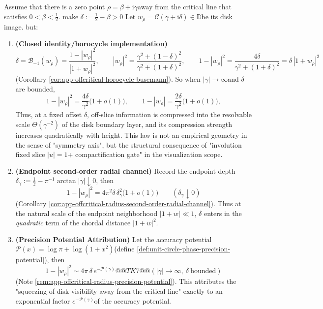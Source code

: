 \begin{theorem}\label{thm:xi-offcritical-quadratic-radial-compression}
Assume that there is a zero point \(\rho=\beta+\mathrm{i}\gamma\) ​​away from the critical line that satisfies \(0<\beta<\tfrac12\).
make
\(
\delta:=\tfrac12-\beta>0
\)
Let \(w_\rho=\mathcal{C}(\gamma+\mathrm{i}\delta)\in\mathbb{D}\) ​​be its disk image.
but:
\begin{enumerate}
  \item ​​\textbf{(Closed identity/horocycle implementation)}
  \[
  \delta=\mathcal{B}_{-1}(w_\rho)=\frac{1-|w_\rho|^2}{|1+w_\rho|^2},
  \qquad
  |w_\rho|^2=\frac{\gamma^2+(1-\delta)^2}{\gamma^2+(1+\delta)^2},
  \qquad
  1-|w_\rho|^2=\frac{4\delta}{\gamma^2+(1+\delta)^2}=\delta\,|1+w_\rho|^2
  \]
  (Corollary \ref{cor:app-offcritical-horocycle-busemann}).
  So when \(|\gamma|\to\infty\) ​​and \(\delta\) are bounded,
  \[
  1-|w_\rho|^{2}=\frac{4\delta}{\gamma^{2}}\bigl(1+o(1)\bigr),
  \qquad
  1-|w_\rho|=\frac{2\delta}{\gamma^{2}}\bigl(1+o(1)\bigr),
  \]
  Thus, at a fixed offset \(\delta\), off-slice information is compressed into the resolvable scale \(\Theta(\gamma^{-2})\) of the disk boundary layer, and its compression strength increases quadratically with height.
  This law is not an empirical geometry in the sense of "symmetry axis", but the structural consequence of "involution fixed slice \(|u|=1\) ​​+ compactification gate" in the visualization scope.
  \item ​​\textbf{(Endpoint second-order radial channel)}
  Record the endpoint depth \(\delta_\gamma:=\tfrac12-\pi^{-1}\arctan|\gamma|\downarrow 0\), then
  \[
  1-|w_\rho|^2
  =4\pi^2\delta\,\delta_\gamma^2\bigl(1+o(1)\bigr)\qquad(\delta_\gamma\downarrow 0)
  \]
  (Corollary \ref{cor:app-offcritical-radius-second-order-radial-channel}).
  Thus at the natural scale of the endpoint neighborhood \(|1+w|\ll 1\), \(\delta\) enters in the \emph{quadratic} term of the chordal distance \(|1+w|^2\).
  \item ​​\textbf{(Precision Potential Attribution)}
  Let the accuracy potential \(\mathcal{P}(x)=\log\pi+\log(1+x^2)\) ​​(define \ref{def:unit-circle-phase-precision-potential}), then
  \[
  1-|w_\rho|^2\sim 4\pi\,\delta\,e^{-\mathcal{P}(\gamma)}@@TK7 @@(|\gamma|\to\infty,\ \delta\ \text{bounded})
  \]
  (Note \ref{rem:app-offcritical-radius-precision-potential}).
  This attributes the "squeezing of disk visibility away from the critical line" exactly to an exponential factor \(e^{-\mathcal{P}(\gamma)}\) ​​of the accuracy potential.
\end{enumerate}
\end{theorem}

